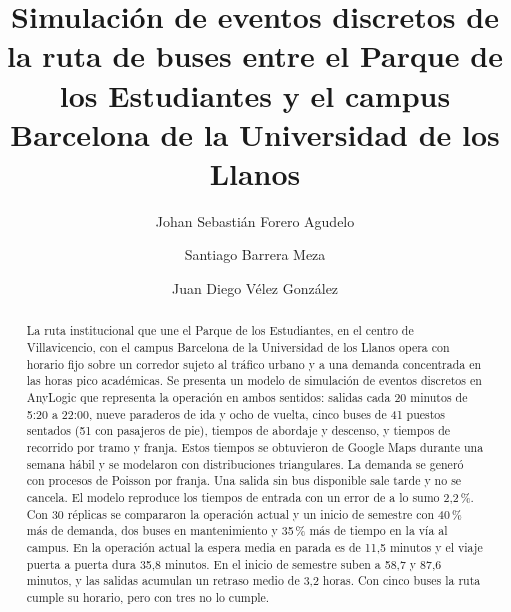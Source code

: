 \documentclass[runningheads]{llncs}
\begin{document}
\renewcommand{\keywordname}{{\bfseries Palabras clave:}}
\renewcommand{\andname}{y}\renewcommand{\lastandname}{\unskip{} y}

\title{Simulación de eventos discretos de la ruta de buses entre el Parque de los Estudiantes y el campus Barcelona de la Universidad de los Llanos}

\author{Johan Sebastián Forero Agudelo \and Santiago Barrera Meza \and Juan Diego Vélez González}


\maketitle

\begin{abstract}
La ruta institucional que une el Parque de los Estudiantes, en el centro de Villavicencio, con el campus Barcelona de la Universidad de los Llanos opera con horario fijo sobre un corredor sujeto al tráfico urbano y a una demanda concentrada en las horas pico académicas. Se presenta un modelo de simulación de eventos discretos en AnyLogic que representa la operación en ambos sentidos: salidas cada 20 minutos de 5:20 a 22:00, nueve paraderos de ida y ocho de vuelta, cinco buses de 41 puestos sentados (51 con pasajeros de pie), tiempos de abordaje y descenso, y tiempos de recorrido por tramo y franja. Estos tiempos se obtuvieron de Google Maps durante una semana hábil y se modelaron con distribuciones triangulares. La demanda se generó con procesos de Poisson por franja. Una salida sin bus disponible sale tarde y no se cancela. El modelo reproduce los tiempos de entrada con un error de a lo sumo 2,2\,\%. Con 30 réplicas se compararon la operación actual y un inicio de semestre con 40\,\% más de demanda, dos buses en mantenimiento y 35\,\% más de tiempo en la vía al campus. En la operación actual la espera media en parada es de 11,5 minutos y el viaje puerta a puerta dura 35,8 minutos. En el inicio de semestre suben a 58,7 y 87,6 minutos, y las salidas acumulan un retraso medio de 3,2 horas. Con cinco buses la ruta cumple su horario, pero con tres no lo cumple.
\end{abstract}
\end{document}
